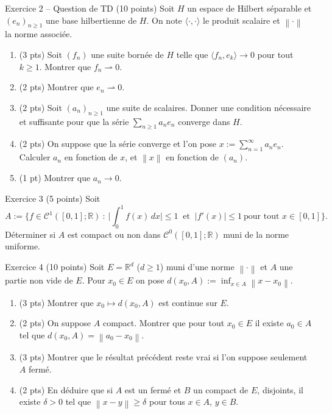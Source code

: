 \documentclass[11pt,a4paper]{article}
\newcommand{\R}{\mathbb{R}}
\newcommand{\norm}[1]{\left\|#1\right\|}
\newcommand{\Cz}{\mathcal{C}^0}
\theoremstyle{definition}
\begin{document}
\begin{exo}{Exercice 2 -- Question de TD (10 points)}
Soit $H$ un espace de Hilbert séparable et $(e_n)_{n\ge1}$ une base hilbertienne de $H$. On note $\langle\cdot,\cdot\rangle$ le produit scalaire et $\norm\cdot$ la norme associée.
\begin{enumerate}[label=\arabic*.]
  \item (3 pts) Soit $(f_n)$ une suite bornée de $H$ telle que $\langle f_n,e_k\rangle\to0$ pour tout $k\ge1$. Montrer que $f_n\rightharpoonup0$.
  \item (2 pts) Montrer que $e_n\rightharpoonup0$.
  \item (2 pts) Soit $(a_n)_{n\ge1}$ une suite de scalaires. Donner une condition nécessaire et suffisante pour que la série $\sum_{n\ge1}a_ne_n$ converge dans $H$.
  \item (2 pts) On suppose que la série converge et l'on pose $x:=\sum_{n=1}^\infty a_ne_n$. Calculer $a_n$ en fonction de $x$, et $\norm x$ en fonction de $(a_n)$.
  \item (1 pt) Montrer que $a_n\to0$.
\end{enumerate}
\end{exo}

\begin{exo}{Exercice 3 (5 points)}
Soit
\[
A:=\Big\{f\in\mathcal C^1([0,1];\R)\ :\ \Big|\int_0^1f(x)\,dx\Big|\le1\ \text{ et }\ |f'(x)|\le1\ \text{pour tout }x\in[0,1]\Big\}.
\]
Déterminer si $A$ est compact ou non dans $\Cz([0,1];\R)$ muni de la norme uniforme.
\end{exo}

\begin{exo}{Exercice 4 (10 points)}
Soit $E=\R^d$ ($d\ge1$) muni d'une norme $\norm\cdot$ et $A$ une partie non vide de $E$. Pour $x_0\in E$ on pose $d(x_0,A):=\inf_{x\in A}\norm{x-x_0}$.
\begin{enumerate}[label=\arabic*.]
  \item (3 pts) Montrer que $x_0\mapsto d(x_0,A)$ est continue sur $E$.
  \item (2 pts) On suppose $A$ compact. Montrer que pour tout $x_0\in E$ il existe $a_0\in A$ tel que $d(x_0,A)=\norm{a_0-x_0}$.
  \item (3 pts) Montrer que le résultat précédent reste vrai si l'on suppose seulement $A$ fermé.
  \item (2 pts) En déduire que si $A$ est un fermé et $B$ un compact de $E$, disjoints, il existe $\delta>0$ tel que $\norm{x-y}\ge\delta$ pour tous $x\in A$, $y\in B$.
\end{enumerate}
\end{exo}
\end{document}
